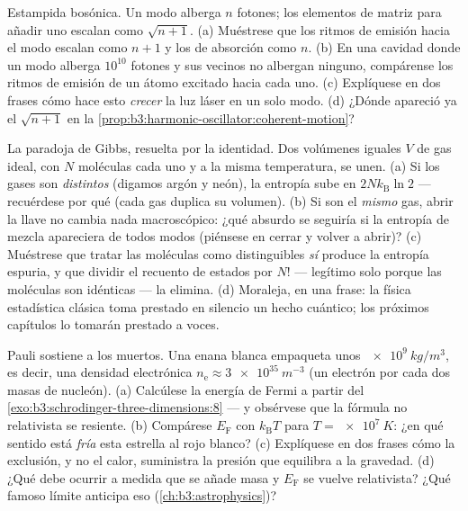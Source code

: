 \begin{exercise}[$\star\star$]\label{exo:b3:identical-particles:9}
Estampida bosónica. Un modo alberga $n$ fotones; los elementos de matriz
para añadir uno escalan como $\sqrt{n+1}$. (a) Muéstrese que los ritmos de
emisión hacia el modo escalan como $n + 1$ y los de absorción como $n$. (b)
En una cavidad donde un modo alberga $10^{10}$ fotones y sus vecinos no
albergan ninguno, compárense los ritmos de emisión de un átomo excitado hacia
cada uno. (c) Explíquese en dos frases cómo hace esto \emph{crecer} la luz
láser en un solo modo. (d) ¿Dónde apareció ya el $\sqrt{n+1}$ en la
\cref{prop:b3:harmonic-oscillator:coherent-motion}?
\end{exercise}

\begin{exercise}[$\star\star\star$]\label{exo:b3:identical-particles:10}
La paradoja de Gibbs, resuelta por la identidad. Dos volúmenes iguales $V$
de gas ideal, con $N$ moléculas cada uno y a la misma temperatura, se unen.
(a) Si los gases son \emph{distintos} (digamos argón y neón), la entropía
sube en $2Nk_{\text{B}}\ln2$ --- recuérdese por qué (cada gas duplica su
volumen). (b) Si son el \emph{mismo} gas, abrir la llave no cambia nada
macroscópico: ¿qué absurdo se seguiría si la entropía de mezcla apareciera
de todos modos (piénsese en cerrar y volver a abrir)?
(c) Muéstrese que tratar las moléculas como distinguibles \emph{sí} produce
la entropía espuria, y que dividir el recuento de estados por $N!$ ---
legítimo solo porque las moléculas son idénticas --- la elimina. (d)
Moraleja, en una frase: la física estadística clásica toma prestado en
silencio un hecho cuántico; los próximos capítulos lo tomarán prestado a
voces.
\end{exercise}

\begin{exercise}[$\star\star\star$]\label{exo:b3:identical-particles:11}
Pauli sostiene a los muertos. Una enana blanca empaqueta unos
$\qty{e9}{kg/m^3}$, es decir, una densidad electrónica $n_{\text{e}} \approx
\qty{3e35}{m^{-3}}$ (un electrón por cada dos masas de nucleón). (a)
Calcúlese la energía de Fermi a partir del
\cref{exo:b3:schrodinger-three-dimensions:8}
--- y obsérvese que la fórmula no relativista se resiente. (b) Compárese
$E_{\text{F}}$ con $k_{\text{B}}T$ para $T = \qty{e7}{K}$: ¿en qué
sentido está \emph{fría} esta estrella al rojo blanco? (c) Explíquese en dos
frases cómo la exclusión, y no el calor, suministra la presión que
equilibra a la gravedad. (d) ¿Qué debe ocurrir a medida que se añade masa y
$E_{\text{F}}$ se vuelve relativista? ¿Qué famoso límite anticipa eso
(\cref{ch:b3:astrophysics})?
\end{exercise}

